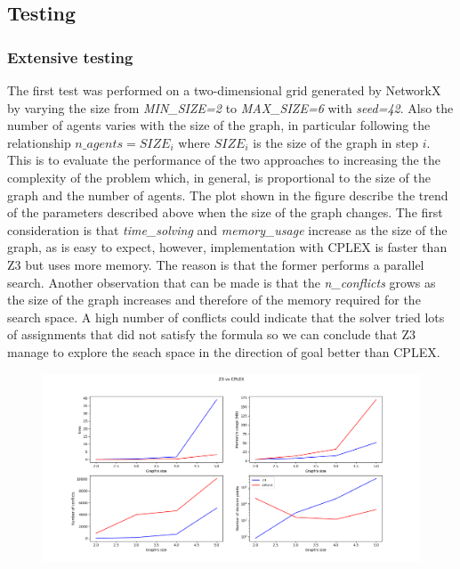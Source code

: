 \documentclass[12pt, a4paper, hidelinks]{article}
\numberwithin{equation}{section}
\begin{document}
\subsection{Testing}\label{subsec:testing}
\subsubsection{Extensive testing}
The first test was performed on a two-dimensional grid generated by NetworkX by varying the size from \textit{MIN\_SIZE=2} to \textit{MAX\_SIZE=6} with \textit{seed=42}.
Also the number of agents varies with the size of the graph, in particular following the relationship $n\_agents = SIZE_i$ where $SIZE_i$ is the size of the graph in step $i$.
This is to evaluate the performance of the two approaches to increasing the the complexity of the problem which, in general, is proportional to the size of the graph and the number of agents. The plot shown in the figure describe the trend of the parameters described above when the size of the graph changes.
The first consideration is that \textit{time\_solving} and \textit{memory\_usage} increase as the size of the graph, as is easy to expect, however, implementation with CPLEX is faster than Z3 but uses more memory. The reason is that the former performs a parallel search. Another observation that can be made is that the \textit{n\_conflicts} grows as the size of the graph increases and therefore of the memory required for the search space. A high number of conflicts could indicate that the solver tried lots of assignments that did not satisfy the formula so we can conclude that Z3 manage to explore the seach space in the direction of goal better than CPLEX.
\begin{figure}[h!]
\begin{center}
  \includegraphics[width=16cm]{plot_test.png}\\
\end{center}
\end{figure}
\end{document}
